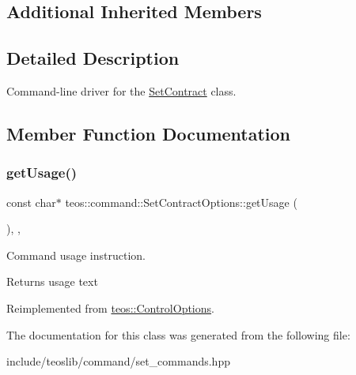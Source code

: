 \subsection*{Additional Inherited Members}


\subsection{Detailed Description}
Command-\/line driver for the \mbox{\hyperlink{classteos_1_1command_1_1_set_contract}{Set\+Contract}} class. 

\subsection{Member Function Documentation}
\mbox{\label{classteos_1_1command_1_1_set_contract_options_a9176e2b58b222d45c975d6e9fa9b4ac7}} 
\subsubsection{\texorpdfstring{get\+Usage()}{getUsage()}}
{\footnotesize\ttfamily const char$\ast$ teos\+::command\+::\+Set\+Contract\+Options\+::get\+Usage (\begin{DoxyParamCaption}{ }\end{DoxyParamCaption})\hspace{0.3cm}{\ttfamily [inline]}, {\ttfamily [protected]}, {\ttfamily [virtual]}}



Command \textquotesingle{}usage\textquotesingle{} instruction. 

\begin{DoxyReturn}{Returns}
usage text 
\end{DoxyReturn}


Reimplemented from \mbox{\hyperlink{classteos_1_1_control_options_a0aa5671f9bc750ed5280c26c543874f3}{teos\+::\+Control\+Options}}.



The documentation for this class was generated from the following file\+:\begin{DoxyCompactItemize}
\item 
include/teoslib/command/set\+\_\+commands.\+hpp\end{DoxyCompactItemize}
